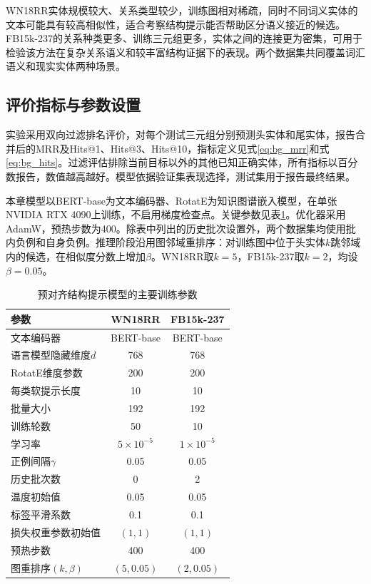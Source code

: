 WN18RR实体规模较大、关系类型较少，训练图相对稀疏，同时不同词义实体的文本可能具有较高相似性，适合考察结构提示能否帮助区分语义接近的候选。FB15k-237的关系种类更多、训练三元组更多，实体之间的连接更为密集，可用于检验该方法在复杂关系语义和较丰富结构证据下的表现。两个数据集共同覆盖词汇语义和现实实体两种场景。

\subsection{评价指标与参数设置}

实验采用双向过滤排名评价，对每个测试三元组分别预测头实体和尾实体，报告合并后的MRR及Hits@1、Hits@3、Hits@10，指标定义见式\eqref{eq:bg_mrr}和式\eqref{eq:bg_hits}。过滤评估排除当前目标以外的其他已知正确实体，所有指标以百分数报告，数值越高越好。模型依据验证集表现选择，测试集用于报告最终结果。

本章模型以BERT-base为文本编码器、RotatE为知识图谱嵌入模型，在单张NVIDIA RTX 4090上训练，不启用梯度检查点。关键参数见表\ref{tab:c3_parameters}。优化器采用AdamW\cite{loshchilov2019decoupled}，预热步数为400。除表中列出的历史批次设置外，两个数据集均使用批内负例和自身负例。推理阶段沿用图邻域重排序：对训练图中位于头实体$k$跳邻域内的候选，在相似度分数上增加$\beta$。WN18RR取$k=5$，FB15k-237取$k=2$，均设$\beta=0.05$。

\begin{table}[!htbp]
\centering
{}
\caption{预对齐结构提示模型的主要训练参数}
\label{tab:c3_parameters}
\begin{tabular}{lcc}
\toprule
参数 & WN18RR & FB15k-237\\
\midrule
文本编码器 & BERT-base & BERT-base\\
语言模型隐藏维度$d$ & 768 & 768\\
RotatE维度参数 & 200 & 200\\
每类软提示长度 & 10 & 10\\
批量大小 & 192 & 192\\
训练轮数 & 50 & 10\\
学习率 & $5\times10^{-5}$ & $1\times10^{-5}$\\
正例间隔$\gamma$ & 0.05 & 0.05\\
历史批次数 & 0 & 2\\
温度初始值 & 0.05 & 0.05\\
标签平滑系数 & 0.1 & 0.1\\
损失权重参数初始值 & $(1,1)$ & $(1,1)$\\
预热步数 & 400 & 400\\
图重排序$(k,\beta)$ & $(5,0.05)$ & $(2,0.05)$\\
\bottomrule
\end{tabular}
\end{table}

